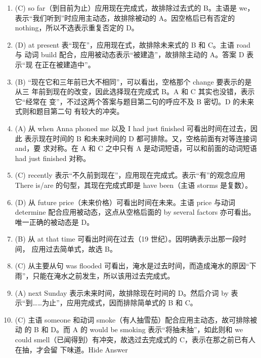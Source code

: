 \begin{enumerate}
\item (C) so far（到目前为止）应用现在完成式，故排除过去式的 B。主语是 we，表示“我们听到”时应用主动态，故排除被动的 A。因空格后已有否定的 nothing，所以不选表示重复否定的 D。

\item (D) at present 表“现在”，应用现在式，故排除未来式的 B 和 C。主语 road 与
  动词 build 配合，应用被动态表示“被建造”，故排除主动的 A。答案 D 表示“现
  在正在被建造中”。

\item (B) “现在它和三年前已大不相同”，可以看出，空格那个 change 要表示的是从三
  年前到现在的改变，因此选择现在完成式 B。A 和 C 其实也没错，表示它“经常在
  变”，不过这两个答案与题目第二句的呼应不及 B 密切。D 的未来式则和题目第二句
  有较大的冲突。

\item (A) 从 when Anna phoned me 以及 I had just finished 可看出时间在过去，因此
  表示现在时间的 B 和未来时间的 D 都可排除。又，空格前面有对等连接词 and，要
  求对称。在 A 和 C 之中只有 A 是动词短语，可以和前面的动词短语 had just
  finished 对称。

\item (C) recently 表示“不久前到现在”，应用现在完成式。表示“有”的观念应用 There is/are 的句型，其现在完成式即是 have been（主语 storms 是复数）。

\item (D) 从 future price（未来价格）可看出时间在未来。主语 price 与动词 determine 配合应用被动态，这点从空格后面的 by several factors 亦可看出。唯一正确的被动态是 D。

\item (B) 从 at that time 可看出时间在过去（19 世纪）。因明确表示出那一段时间，
  应用过去简单式，故选 B。

\item (C) 从主要从句 was flooded 可看出，淹水是过去时间，而造成淹水的原因“下雨”，只能在淹水之前发生，所以该用过去完成式。

\item (A) next Sunday 表示未来时间，故排除现在时间的 D。然后介词 by 表示“到……为止”，应用完成式，因而排除简单式的 B 和 C。

\item (C) 主语 someone 和动词 smoke（有人抽雪茄）配合应用主动态，故可排除被动
  的 B 和 D。而 A 的 would be smoking 表示“将抽未抽”，如此则和 we could
  smell（已闻得到）有冲突，故选过去完成式的 C，表示在那之前已有人在抽，才会留
  下味道。Hide Answer

\end{enumerate}

